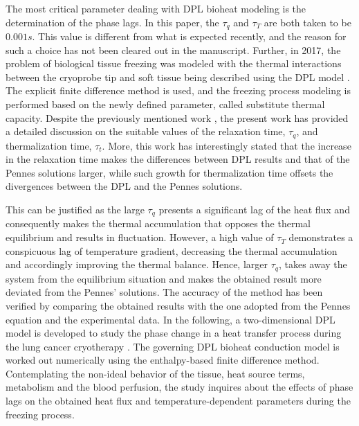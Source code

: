 \documentclass[sn-mathphys]{sn-jnl}%
\theoremstyle{thmstyleone}%
\theoremstyle{thmstyletwo}%
\theoremstyle{thmstylethree}%
\begin{document}
{The most critical parameter dealing with DPL bioheat modeling is the determination of the phase lags. In this paper, the $\tau_q$ and $\tau_T$ are both taken to be $0.001 s$. This value is different from what is expected recently, and the reason for such a choice has not been cleared out in the manuscript. Further, in 2017, the problem of biological tissue freezing was modeled with the thermal interactions between the cryoprobe tip and soft tissue being described using the DPL model \cite{Mochnacki2017}. The explicit finite difference method is used, and the freezing process modeling is performed based on the newly defined parameter, called substitute thermal capacity. Despite the previously mentioned work \cite{Ge2015}, the present work has provided a detailed discussion on the suitable values of the relaxation time, $\tau_q$, and thermalization time, $\tau_t$. More, this work has interestingly stated that the increase in the relaxation time makes the differences between DPL results and that of the Pennes solutions larger, while such growth for thermalization time offsets the divergences between the DPL and the Pennes solutions.

This can be justified as the large $\tau_q$ presents a significant lag of the heat flux and consequently makes the thermal accumulation that opposes the thermal equilibrium and results in fluctuation. However, a high value of $\tau_{T}$ demonstrates a conspicuous lag of temperature gradient, decreasing the thermal accumulation and accordingly improving the thermal balance. Hence, larger $\tau_q$, takes away the system from the equilibrium situation and makes the obtained result more deviated from the Pennes' solutions. The accuracy of the method has been verified by comparing the obtained results with the one adopted from the Pennes equation and the experimental data. In the following, a two-dimensional DPL model is developed to study the phase change in a heat transfer process during the lung cancer cryotherapy \cite{Kumara2017}. The governing DPL bioheat conduction model is worked out numerically using the enthalpy-based finite difference method. 
 Contemplating the non-ideal behavior of the tissue, heat source terms, metabolism and the blood perfusion, the study inquires about the effects of phase lags on the obtained heat flux and temperature-dependent parameters during the freezing process.

}
\end{document}
